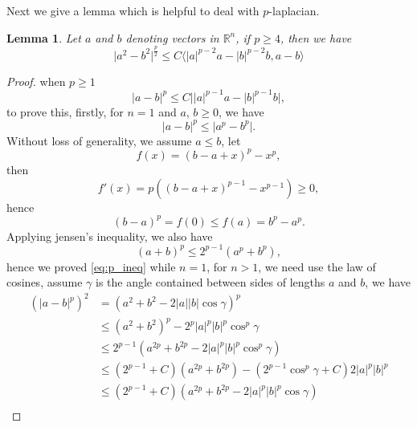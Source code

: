 \documentclass[11pt]{amsart}
\newtheorem{lemma}[theorem]{Lemma}
\theoremstyle{definition}
\numberwithin{equation}{section}
\newcommand*\abs[1]{\lvert#1\rvert}
\newcommand\R{\mathbb{R}}
\begin{document}
Next we give a lemma which is helpful to deal with $p$-laplacian.
\begin{lemma}\label{lem:VecIneq}
	Let $a$ and $b$ denoting vectors in $\R^{n}$, if $p \geq 4$, then we have
	\begin{equation}
		\abs{a^2 - b^2}^{\frac{p}{2}}
		\leq C \langle \abs{a}^{p-2}a - \abs{b}^{p-2}b, a-b\rangle
	\end{equation}
\end{lemma}
\begin{proof}
	when $p \geq 1 $
	\begin{equation}\label{eq:p_ineq}
		\abs{a-b}^p \leq C\abs{\abs{a}^{p-1}a - \abs{b}^{p-1}b},
	\end{equation}
	to prove this, firstly, for $n = 1$ and $a$, $b \geq 0$, we have
	\begin{equation}
		\abs{a-b}^p \leq \abs{a^p - b^p}.
	\end{equation}
	Without loss of generality, we assume $a \leq b$, let
	\begin{equation}
		f(x) = (b-a+x)^p - x^p,
	\end{equation}
	then
	\begin{equation}
		f'(x) = p\left((b-a+x)^{p-1} - x^{p-1}\right) \geq 0,
	\end{equation}
	hence
	\begin{equation}
		\left(b-a\right)^p = f(0) \leq f(a) = b^p - a^p.
	\end{equation}
	Applying jensen's inequality, we also have
	\begin{equation}
		\left(a+b\right)^p \leq 2^{p-1}\left(a^p + b^p\right),
	\end{equation}
	hence we proved \cref{eq:p_ineq} while $n = 1$, for $n > 1$, we need use
	the law of cosines, assume $\gamma$ is the angle contained between sides
	of lengths $a$ and $b$, we have
	\begin{equation}
		\begin{split}
			\left(\abs{a-b}^p\right)^2
			&= \left(a^2 + b^2 - 2 \abs{a}\abs{b}\cos{\gamma}\right)^p\\
			&\leq \left(a^2+b^2\right)^p - 2^p\abs{a}^p\abs{b}^p\cos^p{\gamma}\\
			&\leq 2^{p-1}\left(a^{2p} + b^{2p} - 2\abs{a}^p\abs{b}^p\cos^p{\gamma}\right)\\
			&\leq \left(2^{p-1}+C\right)\left(a^{2p} + b^{2p}\right)
			- \left(2^{p-1}\cos^p{\gamma}+C\right)2\abs{a}^p\abs{b}^p\\
			&\leq \left(2^{p-1}+C\right)\left(a^{2p} + b^{2p} - 2\abs{a}^p\abs{b}^p\cos{\gamma}\right)\\

\end{split}
\end{equation}
\end{proof}
\end{document}
